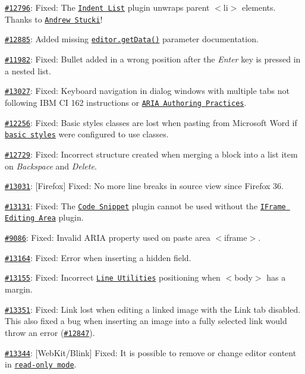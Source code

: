 \begin{DoxyItemize}
\item \href{http://dev.ckeditor.com/ticket/12796}{\tt \#12796}\+: Fixed\+: The \href{http://ckeditor.com/addon/indentlist}{\tt Indent List} plugin unwraps parent {\ttfamily $<$li$>$} elements. Thanks to \href{https://github.com/andrewstucki}{\tt Andrew Stucki}!
\item \href{http://dev.ckeditor.com/ticket/12885}{\tt \#12885}\+: Added missing \href{http://docs.ckeditor.com/#!/api/CKEDITOR.editor-method-getData}{\tt {\ttfamily editor.\+get\+Data()}} parameter documentation.
\item \href{http://dev.ckeditor.com/ticket/11982}{\tt \#11982}\+: Fixed\+: Bullet added in a wrong position after the {\itshape Enter} key is pressed in a nested list.
\item \href{http://dev.ckeditor.com/ticket/13027}{\tt \#13027}\+: Fixed\+: Keyboard navigation in dialog windows with multiple tabs not following I\+BM CI 162 instructions or \href{http://www.w3.org/TR/2013/WD-wai-aria-practices-20130307/#tabpanel}{\tt A\+R\+IA Authoring Practices}.
\item \href{http://dev.ckeditor.com/ticket/12256}{\tt \#12256}\+: Fixed\+: Basic styles classes are lost when pasting from Microsoft Word if \href{http://ckeditor.com/addon/basicstyles}{\tt basic styles} were configured to use classes.
\item \href{http://dev.ckeditor.com/ticket/12729}{\tt \#12729}\+: Fixed\+: Incorrect structure created when merging a block into a list item on {\itshape Backspace} and {\itshape Delete}.
\item \href{http://dev.ckeditor.com/ticket/13031}{\tt \#13031}\+: \mbox{[}Firefox\mbox{]} Fixed\+: No more line breaks in source view since Firefox 36.
\item \href{http://dev.ckeditor.com/ticket/13131}{\tt \#13131}\+: Fixed\+: The \href{http://ckeditor.com/addon/codesnippet}{\tt Code Snippet} plugin cannot be used without the \href{http://ckeditor.com/addon/wysiwygarea}{\tt I\+Frame Editing Area} plugin.
\item \href{http://dev.ckeditor.com/ticket/9086}{\tt \#9086}\+: Fixed\+: Invalid A\+R\+IA property used on paste area {\ttfamily $<$iframe$>$}.
\item \href{http://dev.ckeditor.com/ticket/13164}{\tt \#13164}\+: Fixed\+: Error when inserting a hidden field.
\item \href{http://dev.ckeditor.com/ticket/13155}{\tt \#13155}\+: Fixed\+: Incorrect \href{http://ckeditor.com/addon/lineutils}{\tt Line Utilities} positioning when {\ttfamily $<$body$>$} has a margin.
\item \href{http://dev.ckeditor.com/ticket/13351}{\tt \#13351}\+: Fixed\+: Link lost when editing a linked image with the Link tab disabled. This also fixed a bug when inserting an image into a fully selected link would throw an error (\href{https://dev.ckeditor.com/ticket/12847}{\tt \#12847}).
\item \href{http://dev.ckeditor.com/ticket/13344}{\tt \#13344}\+: \mbox{[}Web\+Kit/\+Blink\mbox{]} Fixed\+: It is possible to remove or change editor content in \href{http://docs.ckeditor.com/#!/guide/dev_readonly}{\tt read-\/only mode}.
\end{DoxyItemize}

